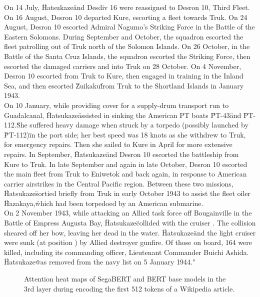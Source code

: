 \documentclass[letterpaper]{article}
\begin{document}
{\begin{minipage}{45em}
\noindent On 14 July, \"Hatsukaze\" and Desdiv 16 were reassigned to Desron 10, Third Fleet.
On 16 August, Desron 10 departed Kure, escorting a fleet towards Truk.
On 24 August, Desron 10 escorted Admiral Nagumo's Striking Force in the Battle of the Eastern Solomons.
During September and October, the squadron escorted the fleet patrolling out of Truk north of the Solomon Islands.
On 26 October, in the Battle of the Santa Cruz Islands, the squadron escorted the Striking Force, then escorted the damaged carriers and into Truk on 28 October.
On 4 November, Desron 10 escorted from Truk to Kure, then engaged in training in the Inland Sea, and then escorted \"Zuikaku\" from Truk to the Shortland Islands in January 1943.\\

\noindent On 10 January, while providing cover for a supply-drum transport run to Guadalcanal, \"Hatsukaze\" assisted in sinking the American PT boats \"PT-43\" and \"PT-112.\"
She suffered heavy damage when struck by a torpedo (possibly launched by \"PT-112)\" in the port side; her best speed was 18 knots as she withdrew to Truk, for emergency repairs.
Then she sailed to Kure in April for more extensive repairs.
In September, \"Hatsukaze\" and Desron 10 escorted the battleship from Kure to Truk.
In late September and again in late October, Desron 10 escorted the main fleet from Truk to Eniwetok and back again, in response to American carrier airstrikes in the Central Pacific region.
Between these two missions, \"Hatsukaze\" sortied briefly from Truk in early October 1943 to assist the fleet oiler \"Hazakaya,\" which had been torpedoed by an American submarine.\\

\noindent On 2 November 1943, while attacking an Allied task force off Bougainville in the Battle of Empress Augusta Bay, \"Hatsukaze\" collided with the cruiser .
The collision sheared off her bow, leaving her dead in the water.
\"Hatsukaze\" and the light cruiser were sunk (at position ) by Allied destroyer gunfire.
Of those on board, 164 were killed, including its commanding officer, Lieutenant Commander Buichi Ashida.\\

\noindent \"Hatsukaze\" was removed from the navy list on 5 January 1944."

\end{minipage}}

\begin{figure*}[ht]
  \centering
  
  \caption{Attention heat maps of SegaBERT and BERT base models in the 3rd layer during encoding the first 512 tokens of a Wikipedia article.}
  \label{fig:heatmap3}
\end{figure*}
\end{document}

